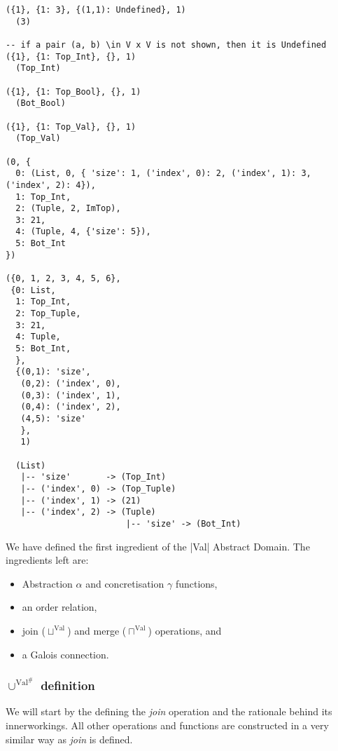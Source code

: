 \begin{verbatim}
({1}, {1: 3}, {(1,1): Undefined}, 1)
  (3)

-- if a pair (a, b) \in V x V is not shown, then it is Undefined
({1}, {1: Top_Int}, {}, 1)
  (Top_Int)

({1}, {1: Top_Bool}, {}, 1)
  (Bot_Bool)

({1}, {1: Top_Val}, {}, 1)
  (Top_Val)

(0, {
  0: (List, 0, { 'size': 1, ('index', 0): 2, ('index', 1): 3, ('index', 2): 4}),
  1: Top_Int,
  2: (Tuple, 2, ImTop),
  3: 21,
  4: (Tuple, 4, {'size': 5}),
  5: Bot_Int
})

({0, 1, 2, 3, 4, 5, 6},
 {0: List,
  1: Top_Int,
  2: Top_Tuple,
  3: 21,
  4: Tuple,
  5: Bot_Int,
  },
  {(0,1): 'size',
   (0,2): ('index', 0),
   (0,3): ('index', 1),
   (0,4): ('index', 2),
   (4,5): 'size'
   },
   1)

  (List)
   |-- 'size'       -> (Top_Int)
   |-- ('index', 0) -> (Top_Tuple)
   |-- ('index', 1) -> (21)
   |-- ('index', 2) -> (Tuple)
                        |-- 'size' -> (Bot_Int)
\end{verbatim}

We have defined the first ingredient of the \pycode|Val| Abstract
Domain. The ingredients left are:

\begin{itemize}
\tightlist
\item
  Abstraction \(\alpha{}\) and concretisation \(\gamma{}\) functions,
\item
  an order relation,
\item
  join (\(\sqcup^{\text{Val}}\)) and merge (\(\sqcap^{\text{Val}}\))
  operations, and
\item
  a Galois connection.
\end{itemize}

\subsubsection*{\(\cup^{\text{Val}^\#}\) definition}

We will start by the defining the \emph{join} operation and the
rationale behind its innerworkings. All other operations and functions
are constructed in a very similar way as \emph{join} is defined.

